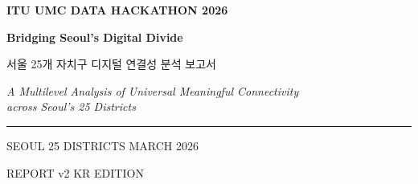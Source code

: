 




\onecolumn
\thispagestyle{empty}
\begin{center}
  \vspace*{0.08\textheight}

  {\sffamily\small\color{muted}\textbf{ITU UMC DATA HACKATHON 2026}}

  \vspace{20pt}

  {\sffamily\bfseries\color{primary}\Huge Bridging Seoul's Digital Divide}

  \vspace{12pt}

  {\sffamily\Large\color{primary} 서울 25개 자치구 디지털 연결성 분석 보고서}

  \vspace{18pt}

  {\itshape\normalsize A Multilevel Analysis of Universal Meaningful Connectivity\\across Seoul's 25 Districts}

  \vspace{32pt}

  {\color{rule}\rule{0.4\textwidth}{0.6pt}}

  \vspace{20pt}

  {\sffamily\small\color{muted}SEOUL \textperiodcentered{} 25 DISTRICTS \textperiodcentered{} MARCH 2026}

  \vspace{6pt}

  {\sffamily\footnotesize\color{muted}REPORT v2 \textperiodcentered{} KR EDITION}
\end{center}
\clearpage

\twocolumn










